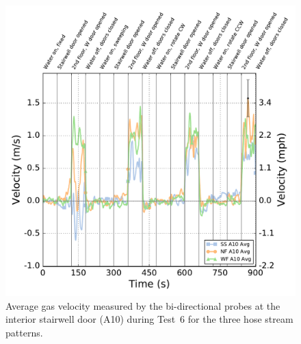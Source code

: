 \documentclass[12pt,oneside]{book}
\begin{document}
\begin{figure}[!ht]
	\includegraphics[width=\columnwidth]{../Figures/Plots/Test_18_West_063014_BDP_A10_stream_avgs}
	\caption[Average gas velocity through the interior stairwell door during Test~6 for the three hose stream patterns.]{Average gas velocity measured by the bi-directional probes at the interior stairwell door (A10) during Test~6 for the three hose stream patterns.}
	\label{fig:Test_6_BDP_A10_Avg_All}
\end{figure}
\FloatBarrier
\end{document}
